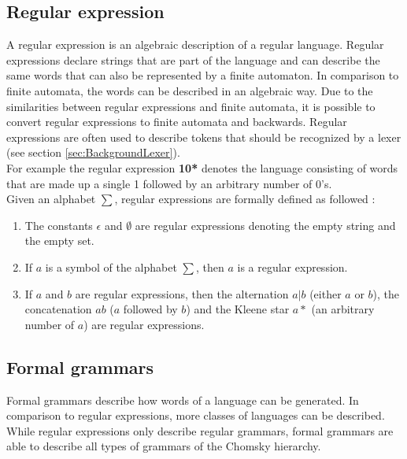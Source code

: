 \subsection{Regular expression}\label{sec:BackgroundRegEx}

A regular expression is an algebraic description of a regular language.
Regular expressions declare strings that are part of the language and can describe the same words that can also be represented by a finite automaton. 
In comparison to finite automata, the words can be described in an algebraic way. 
Due to the similarities between regular expressions and finite automata, it is possible to convert regular expressions to finite automata and backwards. 
Regular expressions are often used to describe tokens that should be recognized by a lexer (see section \ref{sec:BackgroundLexer}). \cite{AutomataTheory.2007}\\
For example the regular expression \textbf{10*} denotes the language consisting of words that are made up a single 1 followed by an arbitrary number of 0's.\\
Given an alphabet $\sum$, regular expressions are formally defined as followed \cite{AutomataTheory.2007}:
\begin{enumerate}
\item The constants $\epsilon$ and $\emptyset$ are regular expressions denoting the empty string and the empty set.
\item If $a$ is a symbol of the alphabet $\sum$, then $a$ is a regular expression.
\item If $a$ and $b$ are regular expressions, then the alternation $a|b$ (either $a$ or $b$), the concatenation $ab$ ($a$ followed by $b$) and the Kleene star $a*$ (an arbitrary number of $a$) are regular expressions.
\end{enumerate}


\subsection{Formal grammars}\label{sec:BackgroundGrammar}

Formal grammars describe how words of a language can be generated. In comparison to regular expressions, more classes of languages can be described. While regular expressions only describe regular grammars, formal grammars are able to describe all types of grammars of the Chomsky hierarchy.


